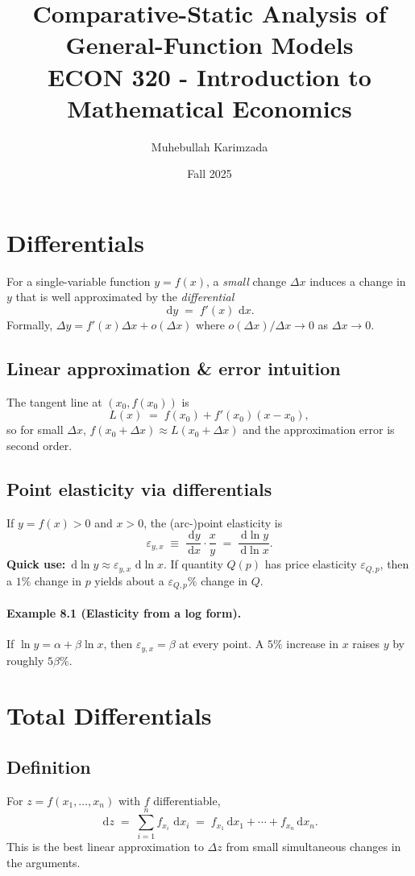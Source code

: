 \documentclass[11pt]{article}
\title{\Large Comparative-Static Analysis of General-Function Models\\[10pt]
\large ECON 320 - Introduction to Mathematical Economics}
\author{Muhebullah Karimzada}
\date{Fall 2025}
\newcommand{\dd}{\,\mathrm{d}}
\begin{document}
\maketitle
\tableofcontents

\newpage
\section{Differentials}

For a single-variable function $y=f(x)$, a \emph{small} change $\Delta x$ induces a change in $y$ that is well approximated by the \emph{differential}
\[
\dd y \;=\; f'(x)\,\dd x.
\]
Formally, $\Delta y = f'(x)\Delta x + o(\Delta x)$ where $o(\Delta x)/\Delta x \to 0$ as $\Delta x\to 0$.

\subsection*{Linear approximation \& error intuition}
The tangent line at $(x_0,f(x_0))$ is
\[
L(x) \;=\; f(x_0) + f'(x_0)(x-x_0),
\]
so for small $\Delta x$, $f(x_0+\Delta x) \approx L(x_0+\Delta x)$ and the approximation error is second order.

\subsection*{Point elasticity via differentials}
If $y=f(x)>0$ and $x>0$, the (arc-)point elasticity is
\[
\varepsilon_{y,x} \;\equiv\; \frac{\dd y}{\dd x}\cdot\frac{x}{y}
\;=\; \frac{\dd\ln y}{\dd\ln x}.
\]
\textbf{Quick use:} $\dd \ln y \approx \varepsilon_{y,x}\, \dd \ln x$. If quantity $Q(p)$ has price elasticity $\varepsilon_{Q,p}$, then a $1\%$ change in $p$ yields about a $\varepsilon_{Q,p}\%$ change in $Q$.

\paragraph{Example 8.1 (Elasticity from a log form).}
If $\ln y = \alpha + \beta \ln x$, then $\varepsilon_{y,x}=\beta$ at every point. A $5\%$ increase in $x$ raises $y$ by roughly $5\beta\%$.

\section{Total Differentials}
\subsection*{Definition}
For $z=f(x_1,\dots,x_n)$ with $f$ differentiable,
\[
\dd z \;=\; \sum_{i=1}^n f_{x_i}\,\dd x_i
\;=\; f_{x_1}\dd x_1 + \cdots + f_{x_n}\dd x_n.
\]
This is the best linear approximation to $\Delta z$ from small simultaneous changes in the arguments.
\end{document}
